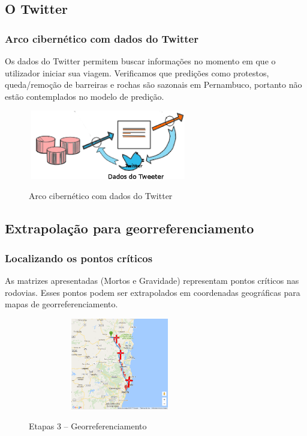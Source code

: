 \documentclass[11pt]{beamer}
\begin{document}
\subsection{O Twitter}
\begin{frame}\frametitle{ Arco cibernético com dados do Twitter}
Os dados do Twitter permitem buscar informações no momento em que o utilizador iniciar sua viagem. 
\pause
Verificamos que predições como protestos, queda/remoção de barreiras e rochas são sazonais em Pernambuco, portanto não estão contemplados no modelo de predição.
\pause
\begin{figure}[ht]
	\centering
	\includegraphics[width=70mm, height=30mm]{Figuras/Metodologia/ArcoCibernetico.png}\\
	\caption{Arco cibernético com dados do Twitter}
\end{figure}
\end{frame}

\subsection{Extrapolação para georreferenciamento}
\begin{frame}
	\frametitle{ Localizando os pontos críticos}
	As matrizes apresentadas (Mortos e Gravidade) representam pontos críticos nas rodovias. Esses pontos podem ser extrapolados em coordenadas geográficas para mapas de georreferenciamento.
	\pause
  \begin{figure}[ht]
	\centering
	\includegraphics[width=80mm, height=40mm]{Figuras/Metodologia/georreferenciamento.png}\\
	\caption{Etapas 3 -- Georreferenciamento}
  \end{figure}
\end{frame}
\end{document}
